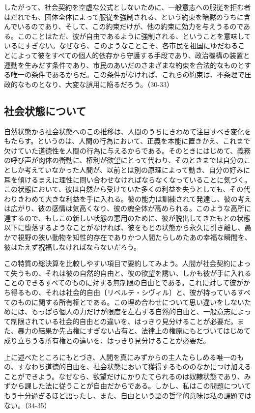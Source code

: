 したがって、社会契約を空虚な公式としないために、一般意志への服従を拒む者はだれでも、団体全体によって服従を強制される、という約束を暗黙のうちに含んでいるのであり、そして、この約束だけが、他の約束に効力を与えうるのである。このことはただ、彼が自由であるように強制される、ということを意味しているにすぎない。なぜなら、このようなことこそ、各市民を祖国にゆだねることによって彼をすべての個人的依存から守護する手段であり、政治機構の装置と運動を生みだす条件であり、市民のあいだのさまざまな約束を合法的なものとする唯一の条件であるからだ。この条件がなければ、これらの約束は、不条理で圧政的なものとなり、大変な誤用に陥るだろう。（30-33）

\subsection{社会状態について}



自然状態から社会状態へのこの推移は、人間のうちにきわめて注目すべき変化をもたらす。というのは、人間の行為において、正義を本能に置きかえ、これまで欠けていた道徳性を人間の行為に与えるからである。そのときにはじめて、義務の呼び声が肉体の衝動に、権利が欲望にとって代わり、そのときまでは自分のことしか考えていなかった人間が、以前とは別の原理によって動き、自分の好みに耳を傾けるまえに理性に問い合わせなければならなくなっていることに気づく。この状態において、彼は自然から受けていた多くの利益を失うとしても、その代わりきわめて大きな利益を手に入れる。彼の能力は訓練されて発達し、彼の考えは広がり、彼の感情は気高くなり、彼の魂全体が高められる。このような高所に達するので、もしこの新しい状態の悪用のために、彼が脱出してきたもとの状態以下に堕落するようなことがなければ、彼をもとの状態から永久に引き離し、愚かで視野の狭い動物を知性的存在でありかつ人間たらしめたあの幸福な瞬間を、彼はたえず祝福しなければならないだろう。

この特質の総決算を比較しやすい項目で要約してみよう。人間が社会契約によって失うもの、それは彼の自然的自由と、彼の欲望を誘い、しかも彼が手に入れることのできるすべてのものに対する無制限の自由とである。これに対して彼がかち得るもの、それは社会的自由〔リベルテ・シヴィル〕と、彼が持っているすべてのものに関する所有権とである。この埋め合わせについて思い違いをしないためには、もっぱら個人の力だけが限度を左右する自然的自由と、一般意志によって制限されている社会的自由との違いを、はっきり見分けることが必要だ。また、暴力の結果か先占権にすぎない占有と、法律上の権原にもとづいてはじめて成り立ちうる所有権との違いを、はっきり見分けることが必要だ。

上に述べたところにもとづき、人間を真にみずからの主人たらしめる唯一のもの、すなわち道徳的自由を、社会状態において獲得するもののなかにつけ加えることができよう。なぜなら、欲望だけにかりたてられるのは奴隷状態であり、みずから課した法に従うことが自由だからである。しかし、私はこの問題についてもう十分過ぎるほど語ったし、また、自由という語の哲学的意味は私の課題ではない。（34-35）

